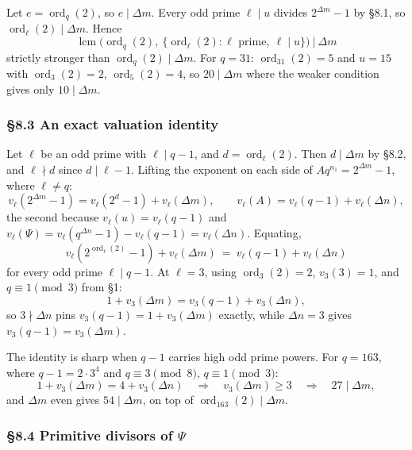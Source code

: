 \documentclass[11pt]{article}
\begin{document}
Let $e = \operatorname{ord}_q(2)$, so $e \mid \Delta m$. Every odd prime $\ell \mid u$ divides $2^{\Delta m}-1$ by \S8.1, so $\operatorname{ord}_\ell(2) \mid \Delta m$. Hence
\[
\boxed{\ \operatorname{lcm}\Big(\operatorname{ord}_q(2),\ \big\{\operatorname{ord}_\ell(2) : \ell \text{ prime},\ \ell \mid u\big\}\Big)\ \Big|\ \Delta m\ }
\]
strictly stronger than $\operatorname{ord}_q(2) \mid \Delta m$. For $q = 31$: $\operatorname{ord}_{31}(2) = 5$ and $u = 15$ with $\operatorname{ord}_3(2)=2$, $\operatorname{ord}_5(2)=4$, so $20 \mid \Delta m$ where the weaker condition gives only $10 \mid \Delta m$.

\subsubsection*{\S8.3 An exact valuation identity}

Let $\ell$ be an odd prime with $\ell \mid q-1$, and $d = \operatorname{ord}_\ell(2)$. Then $d \mid \Delta m$ by \S8.2, and $\ell \nmid d$ since $d \mid \ell-1$. Lifting the exponent on each side of $A q^{n_1} = 2^{\Delta m}-1$, where $\ell \neq q$:
\[
v_\ell\!\left(2^{\Delta m}-1\right) = v_\ell\!\left(2^{d}-1\right) + v_\ell(\Delta m), \qquad
v_\ell(A) = v_\ell(q-1) + v_\ell(\Delta n),
\]
the second because $v_\ell(u) = v_\ell(q-1)$ and $v_\ell(\Psi) = v_\ell\!\left(q^{\Delta n}-1\right)-v_\ell(q-1) = v_\ell(\Delta n)$. Equating,
\[
\boxed{\,v_\ell\!\left(2^{\operatorname{ord}_\ell(2)}-1\right) + v_\ell(\Delta m) \ = \ v_\ell(q-1) + v_\ell(\Delta n)\,}
\]
for every odd prime $\ell \mid q-1$. At $\ell = 3$, using $\operatorname{ord}_3(2) = 2$, $v_3(3) = 1$, and $q \equiv 1 \pmod 3$ from \S1:
\[
1 + v_3(\Delta m) = v_3(q-1) + v_3(\Delta n),
\]
so $3 \nmid \Delta n$ pins $v_3(q-1) = 1 + v_3(\Delta m)$ exactly, while $\Delta n = 3$ gives $v_3(q-1) = v_3(\Delta m)$.

The identity is sharp when $q-1$ carries high odd prime powers. For $q = 163$, where $q - 1 = 2\cdot 3^{4}$ and $q \equiv 3 \pmod 8$, $q \equiv 1 \pmod 3$:
\[
1 + v_3(\Delta m) = 4 + v_3(\Delta n) \quad\Longrightarrow\quad v_3(\Delta m) \geq 3 \quad\Longrightarrow\quad 27 \mid \Delta m,
\]
and $\Delta m$ even gives $54 \mid \Delta m$, on top of $\operatorname{ord}_{163}(2) \mid \Delta m$.

\subsubsection*{\S8.4 Primitive divisors of $\Psi$}
\end{document}
